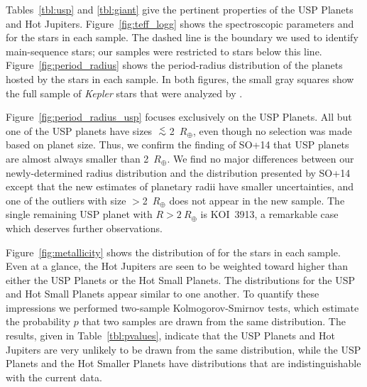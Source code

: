 \documentclass[twocolumn]{aastex6}
\begin{document}
\begin{figure*}
\begin{center}
 \end{center}
  \vspace{-0.25in}
 \caption{ {\bf Orbital period and planetary radius for USP planets.}
   Also marked are the Roche-limiting minimum periods for
   incompressible fluid bodies with mean densities of 0.5, 1.0, 2.0,
   and 4.0~g~cm$^{-3}$, using Eqn.~(2) of \citet{Rappaport+2013}. In
   reality, compression of the planetary interior may lower the
   minimum period by as much as $\approx$15\%.}
 \label{fig:period_radius_usp}
\end{figure*}

Tables~\ref{tbl:usp} and \ref{tbl:giant} give the pertinent properties
of the USP Planets and Hot Jupiters. Figure~\ref{fig:teff_logg} shows
the spectroscopic parameters \teff and \logg for the stars in each
sample. The dashed line is the boundary we used to identify
main-sequence stars; our samples were restricted to stars below this
line.  Figure~\ref{fig:period_radius} shows the period-radius
distribution of the planets hosted by the stars in each sample.  In
both figures, the small gray squares show the full sample of {\it
  Kepler} stars that were analyzed by \citet{Johnson+2017}.

Figure~\ref{fig:period_radius_usp} focuses exclusively on the USP
Planets. All but one of the USP planets have sizes
$\lsim$2~$R_\oplus$, even though no selection was made based on planet
size.  Thus, we confirm the finding of SO+14 that USP planets are
almost always smaller than 2~$R_\oplus$.  We find no major differences
between our newly-determined radius distribution and the distribution
presented by SO+14 except that the new estimates of planetary radii
have smaller uncertainties, and one of the outliers with size
$>$2~$R_\oplus$ does not appear in the new sample. The single
remaining USP planet with $R>2~R_{\oplus}$ is KOI~3913, a remarkable
case which deserves further observations.

Figure~\ref{fig:metallicity} shows the distribution of \fe for the
stars in each sample. Even at a glance, the Hot Jupiters are seen to
be weighted toward higher \fe than either the USP Planets or the Hot
Small Planets. The distributions for the USP and Hot Small Planets
appear similar to one another. To quantify these impressions we
performed two-sample Kolmogorov-Smirnov tests, which estimate the
probability $p$ that two samples are drawn from the same distribution.
The results, given in Table~\ref{tbl:pvalues}, indicate that the USP
Planets and Hot Jupiters are very unlikely to be drawn from the same
distribution, while the USP Planets and the Hot Smaller Planets have
distributions that are indistinguishable with the current data.
\end{document}
